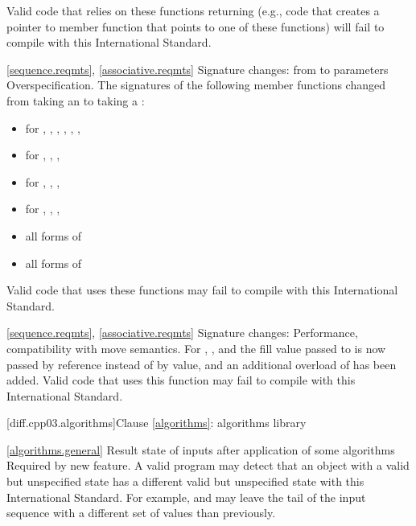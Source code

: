 Valid \CppIII code that relies on these functions returning 
(e.g., code that creates a pointer to member function that points to one
of these functions) will fail to compile with this International Standard.

\ref{sequence.reqmts}, \ref{associative.reqmts}
\change Signature changes: from  to 
parameters
\rationale Overspecification.
\effects
The signatures of the following member functions changed from taking an
 to taking a :

\begin{itemize}
\item {} for , , ,
, , , 
\item {} for , , ,
\item {} for , , , 
\item {} for , , , 
\item all forms of 
\item all forms of 
\end{itemize}

Valid \CppIII code that uses these functions may fail to compile with this
International Standard.

\ref{sequence.reqmts}, \ref{associative.reqmts}
\change Signature changes: 
\rationale Performance, compatibility with move semantics.
\effect
For , , and 
the fill value passed to  is now passed by reference instead of
by value, and an additional overload of  has been added. Valid
\CppIII code that uses this function may fail to compile with this International
Standard.

[diff.cpp03.algorithms]{Clause \ref{algorithms}: algorithms library}

\ref{algorithms.general}
\change Result state of inputs after application of some algorithms
\rationale Required by new feature.
\effect
A valid \CppIII program may detect that an object with a valid but
unspecified state has a different valid but unspecified state with this
International Standard. For example,  and
 may leave the tail of the input sequence with a
different set of values than previously.

